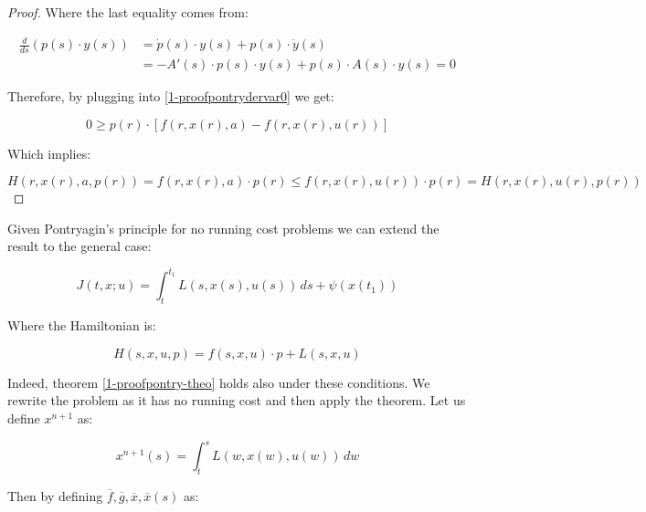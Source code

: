\begin{theorem}
\begin{proof}
        Where the last equality comes from:

        \begin{align*}
            \frac{d}{ds}\left(p(s)\cdot y(s)\right) & = \dot{p}(s)\cdot y(s) + p(s)\cdot \dot{y}(s) \\
            & = -A'(s)\cdot p(s)\cdot y(s) + p(s) \cdot A(s)\cdot y(s) = 0
        \end{align*}

        Therefore, by plugging into \ref{1-proofpontrydervar0} we get:

        \[0\geq p(r)\cdot[f(r,x(r),a)-f(r,x(r),u(r))]\]

        Which implies:

        \[H(r,x(r),a,p(r)) = f(r,x(r),a) \cdot p(r) \leq f(r,x(r),u(r)) \cdot p(r) = H(r,x(r),u(r),p(r))\]
    \end{proof}
\end{theorem}

Given Pontryagin's principle for no running cost problems we can extend the result to the general case:

\begin{equation}
    J(t,x;u) = \int_t^{t_1} L(s,x(s),u(s)) \,ds + \psi(x(t_1))
\end{equation}

Where the Hamiltonian is:

\begin{equation}
    H(s,x,u,p) = f(s,x,u)\cdot p + L(s,x,u)
\end{equation}

Indeed, theorem \ref{1-proofpontry-theo} holds also under these conditions. We rewrite the problem as it has no 
running cost and then apply the theorem. Let us define $x^{n+1}$ as:


\begin{equation}
    x^{n+1}(s) = \int_t^s L(w,x(w),u(w)) \,dw
\end{equation}

Then by defining $\overline{f}, \overline{g}, \overline{x},\overline{x}(s)$ as:

